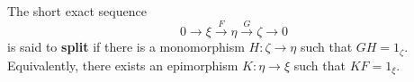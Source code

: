 The short exact sequence
$$0 \to \xi \xrightarrow{F} \eta \xrightarrow{G} \zeta \to 0$$
is said to \textbf{split} if there is a monomorphism $H: \zeta \to \eta$ such that $G H = 1_\zeta$. Equivalently, there exists an epimorphism $K: \eta \to \xi$ such that $K F = 1_\xi$.
